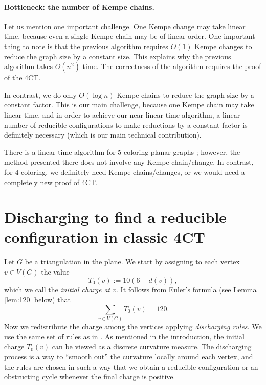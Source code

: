 \documentclass[10pt,a4paper]{article}
\def\showlabel#1{}
\begin{document}
\paragraph{Bottleneck: the number of Kempe chains.}
Let us mention one important challenge. One Kempe change may take linear time, because even a single Kempe chain may be of linear order. One important thing to note is that the previous algorithm \cite{RSST-STOC} requires $O(1)$ Kempe changes to reduce the graph size by a constant size. This explains why the previous algorithm takes $O(n^2)$ time. The correctness of the algorithm requires the proof of the 4CT. 

In contrast, we do only $O(\log n)$ Kempe chains to reduce the graph size by a constant factor. This is our main challenge, because one Kempe chain may take linear time, and in order to achieve our near-linear time algorithm, a linear number of reducible configurations to make reductions by a constant factor is definitely necessary (which is our main technical contribution). 

There is a linear-time algorithm for 5-coloring planar graphs \cite{CHIBA1981317}; however, the method presented there does not involve any Kempe chain/change. In contrast, for 4-coloring, we definitely need Kempe chains/changes, or we would need a completely new proof of 4CT. 


\section{Discharging to find a reducible configuration in classic 4CT}
\label{sect:discharging}\showlabel{sect:discharging}

Let $G$ be a triangulation in the plane. We start by assigning to each vertex $v \in V(G)$ the value 
$$
    T_0(v) := 10(6 - d(v)),
$$
which we call the \emph{initial charge at $v$}. It follows from Euler's formula (see Lemma \ref{lem:120} below) that 
$$
    \sum_{v\in V(G)} T_0(v) = 120.
$$
Now we redistribute the charge among the vertices applying \emph{discharging rules}. We use the same set of rules as in \cite{steinberger2010unavoidable}. As mentioned in the introduction, the initial charge $T_0(v)$ can be viewed as a discrete curvature measure. The discharging process is a way to ``smooth out'' the curvature locally around each vertex, and the rules are chosen in such a way that we obtain a reducible configuration or an obstructing cycle whenever the final charge is positive. 
\end{document}
